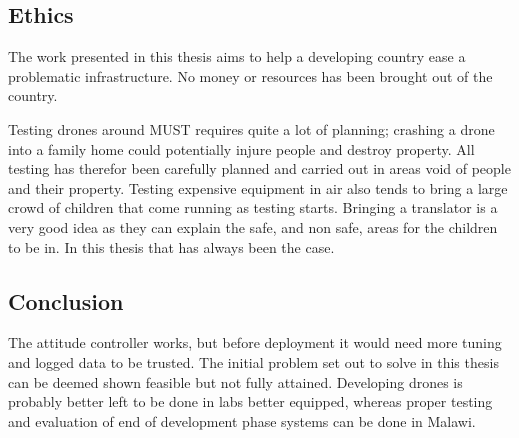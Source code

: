 \documentclass{article}
\begin{document}
\subsection{Ethics}
The work presented in this thesis aims to help a developing country ease a problematic infrastructure.
No money or resources has been brought out of the country.

Testing drones around MUST requires quite a lot of planning; crashing a drone into a family home could potentially injure people and destroy property.
All testing has therefor been carefully planned and carried out in areas void of people and their property.
Testing expensive equipment in air also tends to bring a large crowd of children that come running as testing starts.
Bringing a translator is a very good idea as they can explain the safe, and non safe, areas for the children to be in.
In this thesis that has always been the case.


\subsection{Conclusion}
The attitude controller works, but before deployment it would need more tuning and logged data to be trusted.
The initial problem set out to solve in this thesis can be deemed shown feasible but not fully attained.
Developing drones is probably better left to be done in labs better equipped, whereas proper testing and evaluation of end of development phase systems can be done in Malawi.


\newpage
\end{document}

